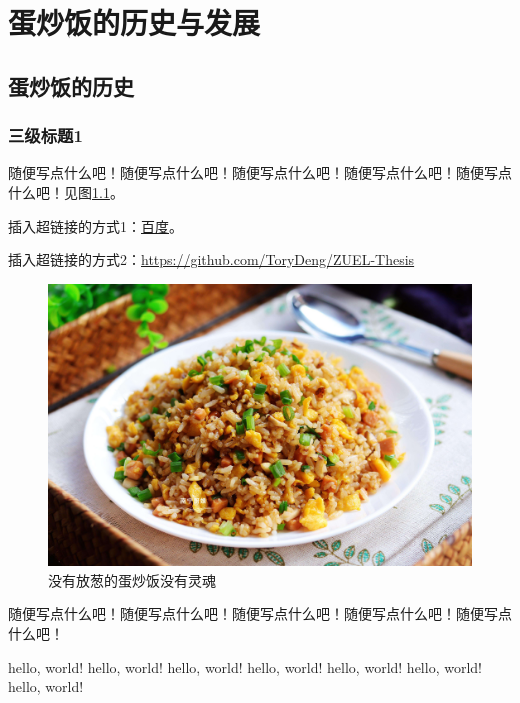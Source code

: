 \chapter{蛋炒饭的历史与发展}
\section{蛋炒饭的历史}
\subsection{三级标题1}
随便写点什么吧！随便写点什么吧！随便写点什么吧！随便写点什么吧！随便写点什么吧！见图\ref{fig:my_label}。

插入超链接的方式1：\href{http://www.baidu.com}{百度}。 \par
插入超链接的方式2：\url{https://github.com/ToryDeng/ZUEL-Thesis}

\begin{figure}[h]
    \centering
    \includegraphics[scale=0.1]{imgs/蛋炒饭.jpeg}
    \caption{没有放葱的蛋炒饭没有灵魂}
    \label{fig:my_label}
\end{figure}

随便写点什么吧！随便写点什么吧！随便写点什么吧！随便写点什么吧！随便写点什么吧！

hello, world! hello, world! hello, world! hello, world! hello, world! hello, world! hello, world!